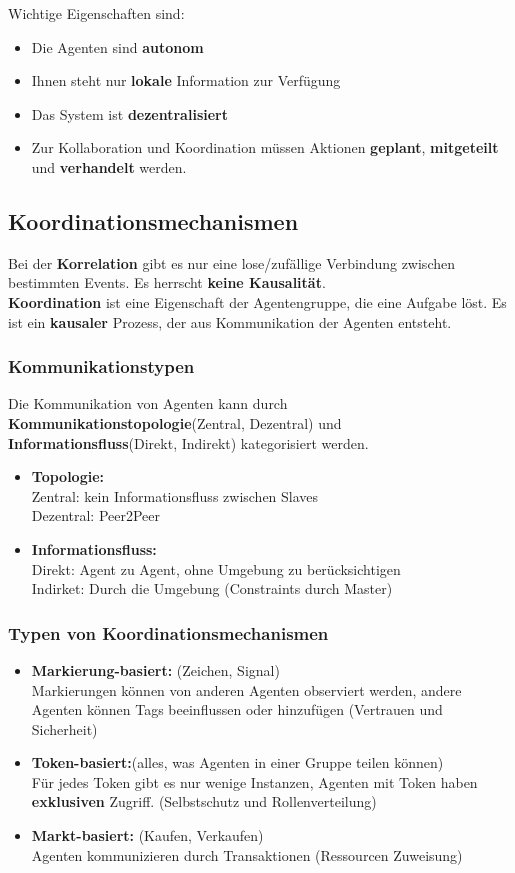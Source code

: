 \documentclass[a4paper]{article}
\begin{document}
Wichtige Eigenschaften sind:
\begin{itemize}
	\item Die Agenten sind \textbf{autonom}
	\item Ihnen steht nur \textbf{lokale} Information zur Verfügung
	\item Das System ist \textbf{dezentralisiert}
	\item Zur Kollaboration und Koordination müssen Aktionen \textbf{geplant}, \textbf{mitgeteilt} und \textbf{verhandelt} werden.
\end{itemize}

\subsection{Koordinationsmechanismen}
Bei der \textbf{Korrelation} gibt es nur eine lose/zufällige Verbindung zwischen bestimmten Events. Es herrscht \textbf{keine Kausalität}.\\

\textbf{Koordination} ist eine Eigenschaft der Agentengruppe, die eine Aufgabe löst. Es ist ein \textbf{kausaler} Prozess, der aus Kommunikation der Agenten entsteht.
\subsubsection{Kommunikationstypen}
Die Kommunikation von Agenten kann durch \textbf{Kommunikationstopologie}(Zentral, Dezentral) und \textbf{Informationsfluss}(Direkt, Indirekt) kategorisiert werden.
\begin{itemize}
	\item \textbf{Topologie:}\\
	Zentral: kein Informationsfluss zwischen Slaves\\
	Dezentral: Peer2Peer
	\item \textbf{Informationsfluss:}\\
	Direkt: Agent zu Agent, ohne Umgebung zu berücksichtigen\\
	Indirket: Durch die Umgebung (Constraints durch Master)
\end{itemize}
\subsubsection{Typen von Koordinationsmechanismen}
\begin{itemize}
	\item \textbf{Markierung-basiert:} (Zeichen, Signal)\\
	Markierungen können von anderen Agenten observiert werden, andere Agenten können Tags beeinflussen oder hinzufügen (Vertrauen und Sicherheit)
	\item \textbf{Token-basiert:}(alles, was Agenten in einer Gruppe teilen können)\\
	Für jedes Token gibt es nur wenige Instanzen, Agenten mit Token haben \textbf{exklusiven} Zugriff. (Selbstschutz und Rollenverteilung)
	\item \textbf{Markt-basiert:} (Kaufen, Verkaufen)\\
	Agenten kommunizieren durch Transaktionen (Ressourcen Zuweisung)
\end{itemize}
\end{document}
